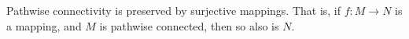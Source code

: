 Pathwise connectivity is preserved by surjective mappings. That is, if $f: M \rightarrow N$ is a mapping, and $M$ is pathwise connected, then so also is $N$.
